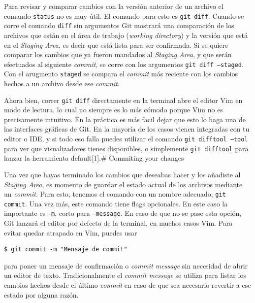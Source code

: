 \documentclass[spanish, 12pt, a4paper]{article}
\begin{document}
Para revisar y comparar cambios con la versión anterior de un archivo el
comando \passthrough{\lstinline!status!} no es muy útil. El comando para
esto es \passthrough{\lstinline!git diff!}. Cuando se corre el comando
\passthrough{\lstinline!diff!} sin argumentos Git mostrará una
comparación de los archivos que están en el área de trabajo
(\emph{working directory}) y la versión que está en el \emph{Staging
Area}, es decir que está lista para ser confirmada. Si se quiere
comparar los cambios que ya fueron mandados al \emph{Staging Area}, y
que serán efectuados al siguiente \emph{commit}, se corre con los
argumentos \passthrough{\lstinline!git diff –staged!}. Con el arugmento
\passthrough{\lstinline!staged!} se compara el \emph{commit} más
reciente con los cambios hechos a un archivo desde ese \emph{commit}.

Ahora bien, correr \passthrough{\lstinline!git diff!} directamente en la
terminal abre el editor Vim en modo de lectura, lo cual no siempre es lo
más cómodo porque Vim no es precisamente intuitivo. En la práctica es
más facil dejar que esto lo haga una de las interfaces gráficas de Git.
En la mayoría de los casos vienen integradas con tu editor o IDE, y si
todo eso falla puedes utilizar el comando
\passthrough{\lstinline!git difftool –tool!} para ver que visualizadores
tienes disponibles, o simplemente \passthrough{\lstinline!git difftool!}
para lanzar la herramienta default{[}1{]}.\# Commiting your changes

Una vez que hayas terminado los cambios que deseabas hacer y los
añadiste al \emph{Staging Area}, es momento de guardar el estado actual
de los archivos mediante un \emph{commit}. Para esto, tenemos el comando
con un nombre adecuado, \passthrough{\lstinline!git commit!}. Una vez
más, este comando tiene flags opcionales. En este caso la importante es
\passthrough{\lstinline!-m!}, corto para
\passthrough{\lstinline!–message!}. En caso de que no se pase esta
opción, Git lanzará el editor por defecto de la terminal, en muchos
casos Vim. Para evitar quedar atrapado en Vim, puedes usar

\begin{lstlisting}
$ git commit -m "Mensaje de commit"
\end{lstlisting}

para poner un mensaje de confirmación o \emph{commit message} sin
necesidad de abrir un editor de texto. Tradicionalmente el \emph{commit
message} se utiliza para listar los cambios hechos desde el último
\emph{commit} en caso de que sea necesario revertir a ese estado por
alguna razón.
\end{document}
